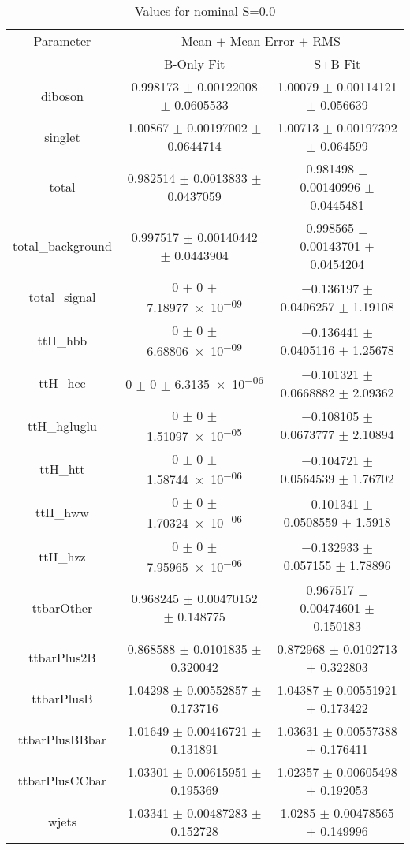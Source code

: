 \begin{table}
\centering
\caption{Values for nominal S=0.0}
\begin{tabular}{ccc}
\toprule
Parameter & \multicolumn{2}{c}{Mean $\pm$ Mean Error $\pm$ RMS}\\
 & B-Only Fit & S+B Fit\\
\midrule
diboson & \num{0.998173} $\pm$ \num{0.00122008} $\pm$ \num{0.0605533} & \num{1.00079} $\pm$ \num{0.00114121} $\pm$ \num{0.056639}\\
singlet & \num{1.00867} $\pm$ \num{0.00197002} $\pm$ \num{0.0644714} & \num{1.00713} $\pm$ \num{0.00197392} $\pm$ \num{0.064599}\\
total & \num{0.982514} $\pm$ \num{0.0013833} $\pm$ \num{0.0437059} & \num{0.981498} $\pm$ \num{0.00140996} $\pm$ \num{0.0445481}\\
total\_background & \num{0.997517} $\pm$ \num{0.00140442} $\pm$ \num{0.0443904} & \num{0.998565} $\pm$ \num{0.00143701} $\pm$ \num{0.0454204}\\
total\_signal & \num{0} $\pm$ \num{0} $\pm$ \num{7.18977e-09} & \num{-0.136197} $\pm$ \num{0.0406257} $\pm$ \num{1.19108}\\
ttH\_hbb & \num{0} $\pm$ \num{0} $\pm$ \num{6.68806e-09} & \num{-0.136441} $\pm$ \num{0.0405116} $\pm$ \num{1.25678}\\
ttH\_hcc & \num{0} $\pm$ \num{0} $\pm$ \num{6.3135e-06} & \num{-0.101321} $\pm$ \num{0.0668882} $\pm$ \num{2.09362}\\
ttH\_hgluglu & \num{0} $\pm$ \num{0} $\pm$ \num{1.51097e-05} & \num{-0.108105} $\pm$ \num{0.0673777} $\pm$ \num{2.10894}\\
ttH\_htt & \num{0} $\pm$ \num{0} $\pm$ \num{1.58744e-06} & \num{-0.104721} $\pm$ \num{0.0564539} $\pm$ \num{1.76702}\\
ttH\_hww & \num{0} $\pm$ \num{0} $\pm$ \num{1.70324e-06} & \num{-0.101341} $\pm$ \num{0.0508559} $\pm$ \num{1.5918}\\
ttH\_hzz & \num{0} $\pm$ \num{0} $\pm$ \num{7.95965e-06} & \num{-0.132933} $\pm$ \num{0.057155} $\pm$ \num{1.78896}\\
ttbarOther & \num{0.968245} $\pm$ \num{0.00470152} $\pm$ \num{0.148775} & \num{0.967517} $\pm$ \num{0.00474601} $\pm$ \num{0.150183}\\
ttbarPlus2B & \num{0.868588} $\pm$ \num{0.0101835} $\pm$ \num{0.320042} & \num{0.872968} $\pm$ \num{0.0102713} $\pm$ \num{0.322803}\\
ttbarPlusB & \num{1.04298} $\pm$ \num{0.00552857} $\pm$ \num{0.173716} & \num{1.04387} $\pm$ \num{0.00551921} $\pm$ \num{0.173422}\\
ttbarPlusBBbar & \num{1.01649} $\pm$ \num{0.00416721} $\pm$ \num{0.131891} & \num{1.03631} $\pm$ \num{0.00557388} $\pm$ \num{0.176411}\\
ttbarPlusCCbar & \num{1.03301} $\pm$ \num{0.00615951} $\pm$ \num{0.195369} & \num{1.02357} $\pm$ \num{0.00605498} $\pm$ \num{0.192053}\\
wjets & \num{1.03341} $\pm$ \num{0.00487283} $\pm$ \num{0.152728} & \num{1.0285} $\pm$ \num{0.00478565} $\pm$ \num{0.149996}\\
\bottomrule
\end{tabular}
\end{table}